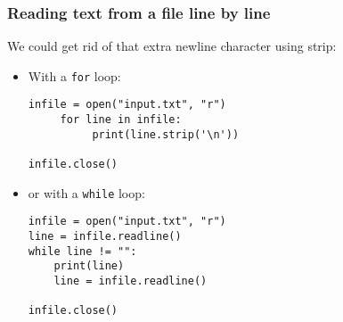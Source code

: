 \documentclass[xcolor=svgnames]{beamer}
\newcommand{\nl}{\\[1em]}
\newcommand{\ft}[1]{\frametitle{#1}}
\begin{document}
%
%
%

%
%
%
%



\begin{frame}[fragile]\ft{Reading text from a file line by line}
We could get rid of that extra newline character using strip:
\begin{itemize}
\item With a {\tt for} loop:
\begin{Verbatim}[xleftmargin=.5in, frame=single]
infile = open("input.txt", "r")
     for line in infile:
          print(line.strip('\n'))
          
infile.close()
\end{Verbatim}
\item or with a {\tt while} loop:
\begin{Verbatim}[xleftmargin=.5in, frame=single]
infile = open("input.txt", "r")
line = infile.readline()
while line != "":
    print(line)
    line = infile.readline()

infile.close()
\end{Verbatim}
\end{itemize}
\end{frame}
\end{document}
